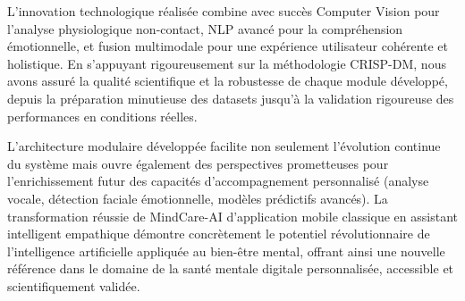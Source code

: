 L'innovation technologique réalisée combine avec succès Computer Vision pour l'analyse physiologique non-contact, NLP avancé pour la compréhension émotionnelle, et fusion multimodale pour une expérience utilisateur cohérente et holistique. En s'appuyant rigoureusement sur la méthodologie CRISP-DM, nous avons assuré la qualité scientifique et la robustesse de chaque module développé, depuis la préparation minutieuse des datasets jusqu'à la validation rigoureuse des performances en conditions réelles.

L'architecture modulaire développée facilite non seulement l'évolution continue du système mais ouvre également des perspectives prometteuses pour l'enrichissement futur des capacités d'accompagnement personnalisé (analyse vocale, détection faciale émotionnelle, modèles prédictifs avancés). La transformation réussie de MindCare-AI d'application mobile classique en assistant intelligent empathique démontre concrètement le potentiel révolutionnaire de l'intelligence artificielle appliquée au bien-être mental, offrant ainsi une nouvelle référence dans le domaine de la santé mentale digitale personnalisée, accessible et scientifiquement validée.